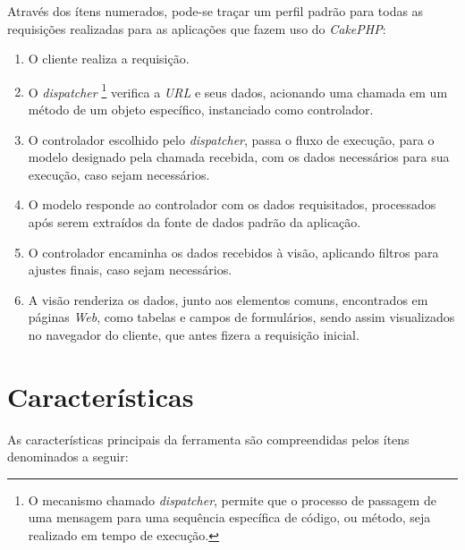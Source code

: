 Através dos ítens numerados, pode-se traçar um perfil padrão para todas as requisições realizadas para as aplicações que fazem uso do \textit{CakePHP}:
\begin{enumerate}
    \item O cliente realiza a requisição.

    \item O \textit{dispatcher} \footnote{O mecanismo chamado \textit{dispatcher}, permite que o processo de passagem de uma mensagem para uma sequência específica de código, ou método, seja realizado em tempo de execução.} verifica a \textit{URL} e seus dados, acionando uma chamada em um método de um objeto específico, instanciado como controlador.

    \item O controlador escolhido pelo \textit{dispatcher}, passa o fluxo de execução, para o modelo designado pela chamada recebida, com os dados necessários para sua execução, caso sejam necessários.

    \item O modelo responde ao controlador com os dados requisitados, processados após serem extraídos da fonte de dados padrão da aplicação.

    \item O controlador encaminha os dados recebidos à visão, aplicando filtros para ajustes finais, caso sejam necessários.

    \item A visão renderiza os dados, junto aos elementos comuns, encontrados em páginas \textit{Web}, como tabelas e campos de formulários, sendo assim visualizados no navegador do cliente, que antes fizera a requisição inicial.
\end{enumerate}

\clearpage
\section{Características}

As características principais da ferramenta são compreendidas pelos ítens denominados a seguir:

